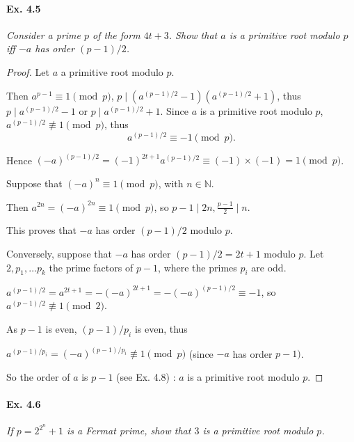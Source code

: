 \documentclass[11pt,a4paper]{article}
\newcommand{\N}{\mathbb{N}}
\begin{document}
\paragraph{Ex. 4.5}

{\it Consider a prime $p$ of the form $4t + 3$. Show that $a$ is a primitive root modulo $p$ iff $-a$ has order $(p - 1)/2$.
}

\begin{proof}
Let $a$ a primitive root modulo $p$. 

Then $a^{p-1} \equiv 1 \pmod p$, $p \mid (a^{(p-1)/2} - 1)(a^{(p-1)/2} + 1)$, thus $p \mid a^{(p-1)/2} - 1$ or $p \mid a^{(p-1)/2} + 1$. Since $a$ is a primitive root modulo $p$, $a^{(p-1)/2} \not \equiv 1 \pmod p$, thus 
$$a^{(p-1)/2} \equiv -1 \pmod p.$$

Hence $(-a)^{(p-1)/2} = (-1)^{2t+1} a^{(p-1)/2}  \equiv (-1)\times (-1) =1 \pmod p$.

Suppose that  $(-a)^n \equiv 1 \pmod p$, with $n \in \N$.


Then $a^{2n} = (-a)^{2n} \equiv 1 \pmod p$, so $p-1 \mid 2n, \frac{p-1}{2} \mid n$.

This proves that $-a$ has order $(p-1)/2$ modulo $p$.

\bigskip

Conversely, suppose that $-a$ has order $(p-1)/2 = 2t+1$ modulo $p$. Let $2,p_1,\ldots p_k$ the prime factors of $p-1$, where the primes $p_i$ are odd.

$a^{(p-1)/2} = a^{2t+1} = -(-a)^{2t+1} = -(-a)^{(p-1)/2} \equiv - 1$, so $a^{(p-1)/2} \not \equiv 1 \pmod 2$.

As $p-1$ is even, $(p-1)/p_i$ is even, thus

$a^{(p-1)/p_i} = (-a)^{(p-1)/p_i} \not \equiv 1 \pmod p$ (since $-a$ has order $p-1)$.

So the order of $a$ is $p-1$ (see Ex. 4.8) : $a$ is a primitive root modulo $p$.
\end{proof}


\paragraph{Ex. 4.6}

{\it If $p = 2^{2^n} + 1$ is a Fermat prime, show that $3$ is a primitive root modulo $p$.
}
\end{document}
